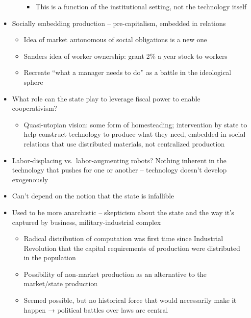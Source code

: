 \begin{itemize}
\begin{itemize}
    \begin{itemize}
    \tightlist
    \item
      This is a function of the institutional setting, not the
      technology itself
    \end{itemize}
  \end{itemize}
\item
  Socially embedding production -- pre-capitalism, embedded in relations

  \begin{itemize}
  \tightlist
  \item
    Idea of market autonomous of social obligations is a new one
  \item
    Sanders idea of worker ownership: grant 2\% a year stock to workers
  \item
    Recreate ``what a manager needs to do'' as a battle in the
    ideological sphere
  \end{itemize}
\item
  What role can the state play to leverage fiscal power to enable
  cooperativism?

  \begin{itemize}
  \tightlist
  \item
    Quasi-utopian vision: some form of homesteading; intervention by
    state to help construct technology to produce what they need,
    embedded in social relations that use distributed materials, not
    centralized production
  \end{itemize}
\item
  Labor-displacing vs.~labor-augmenting robots? Nothing inherent in the
  technology that pushes for one or another -- technology doesn't
  develop exogenously
\item
  Can't depend on the notion that the state is infallible
\item
  Used to be more anarchistic -- skepticism about the state and the way
  it's captured by business, military-industrial complex

  \begin{itemize}
  \tightlist
  \item
    Radical distribution of computation was first time since Industrial
    Revolution that the capital requirements of production were
    distributed in the population
  \item
    Possibility of non-market production as an alternative to the
    market/state production
  \item
    Seemed possible, but no historical force that would necessarily make
    it happen → political battles over laws are central


\end{itemize}
\end{itemize}

